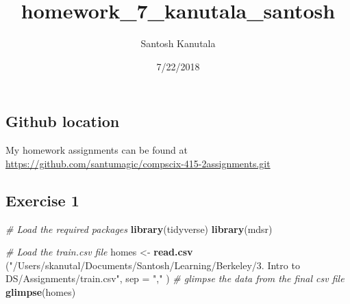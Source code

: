 \documentclass[]{article}
\title{homework\_7\_kanutala\_santosh}
\author{Santosh Kanutala}
\date{7/22/2018}
\newenvironment{Shaded}{\begin{snugshade}}{\end{snugshade}}
\newcommand{\KeywordTok}[1]{\textcolor[rgb]{0.13,0.29,0.53}{\textbf{#1}}}
\newcommand{\DataTypeTok}[1]{\textcolor[rgb]{0.13,0.29,0.53}{#1}}
\newcommand{\StringTok}[1]{\textcolor[rgb]{0.31,0.60,0.02}{#1}}
\newcommand{\CommentTok}[1]{\textcolor[rgb]{0.56,0.35,0.01}{\textit{#1}}}
\newcommand{\NormalTok}[1]{#1}
\begin{document}
\maketitle

{
\setcounter{tocdepth}{3}
\tableofcontents
}
\newpage

\subsection{Github location}\label{github-location}

My homework assignments can be found at
\url{https://github.com/santumagic/compscix-415-2assignments.git}

\subsection{Exercise 1}\label{exercise-1}

\begin{Shaded}
\begin{Highlighting}[]
\CommentTok{# Load the required packages}
\KeywordTok{library}\NormalTok{(tidyverse)}
\KeywordTok{library}\NormalTok{(mdsr)}
\end{Highlighting}
\end{Shaded}

\begin{Shaded}
\begin{Highlighting}[]
\CommentTok{# Load the train.csv file}
\NormalTok{homes <-}\StringTok{ }\KeywordTok{read.csv}\NormalTok{ (}\StringTok{"/Users/skanutal/Documents/Santosh/Learning/Berkeley/3. Intro to DS/Assignments/train.csv"}\NormalTok{, }\DataTypeTok{sep =} \StringTok{","}\NormalTok{ )}
\CommentTok{# glimpse the data from the final csv file}
\KeywordTok{glimpse}\NormalTok{(homes)}
\end{Highlighting}
\end{Shaded}
\end{document}
